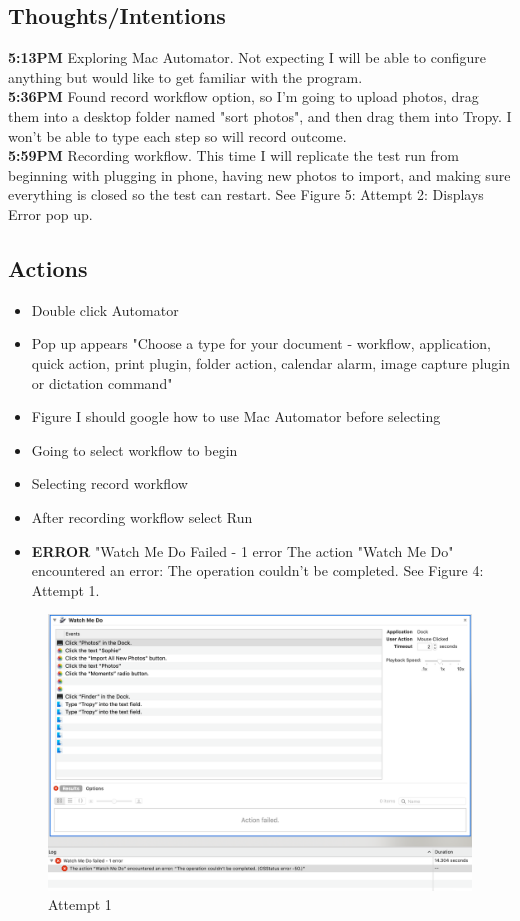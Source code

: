 \documentclass{article}
\begin{document}
\subsection{Thoughts/Intentions}
\textbf{5:13PM} Exploring Mac Automator. Not expecting I will be able to configure anything but would like to get familiar with the program. \\
\textbf{5:36PM} Found record workflow option, so I'm going to upload photos, drag them into a desktop folder named "sort photos", and then drag them into Tropy. I won't be able to type each step so will record outcome. \\
\textbf{5:59PM} Recording workflow. This time I will replicate the test run from beginning with plugging in phone, having new photos to import, and making sure everything is closed so the test can restart. See Figure 5: Attempt 2: Displays Error pop up.

\subsection{Actions}
\begin{itemize}
\item Double click Automator
\item Pop up appears "Choose a type for your document - workflow, application, quick action, print plugin, folder action, calendar alarm, image capture plugin or dictation command"
\item Figure I should google how to use Mac Automator before selecting
\item Going to select workflow to begin
\item Selecting record workflow 
\item After recording workflow select Run
\item \textbf{ERROR} "Watch Me Do Failed - 1 error The action "Watch Me Do" encountered an error: The operation couldn't be completed. See Figure 4: Attempt 1. 
\end{itemize}

\begin{figure}[H]
    \centering
    \includegraphics[width=\textwidth]{Images/Automator_1.png}
    \caption{Attempt 1}
    \label{fig:my_label}
\end{figure}
\end{document}
